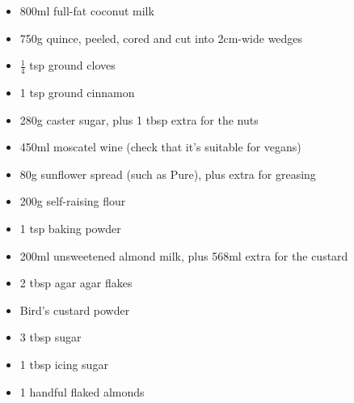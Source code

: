 \documentclass{book}
\begin{document}
\begin{itemize}
\item 800ml full-fat coconut milk
\item 750g quince, peeled, cored and cut into 2cm-wide wedges 
\item $\frac{1}{4}$ tsp ground cloves 
\item 1 tsp ground cinnamon 
\item 280g caster sugar, plus 1 tbsp extra for the nuts
\item 450ml moscatel wine (check that it’s suitable for vegans) 
\item 80g sunflower spread (such as Pure), plus extra for greasing
\item 200g self-raising flour 
\item 1 tsp baking powder
\item 200ml unsweetened almond milk, plus 568ml extra for the custard
\item 2 tbsp agar agar flakes 
\item Bird’s custard powder
\item 3 tbsp sugar
\item 1 tbsp icing sugar
\item 1 handful flaked almonds 
\end{itemize}
\end{document}
